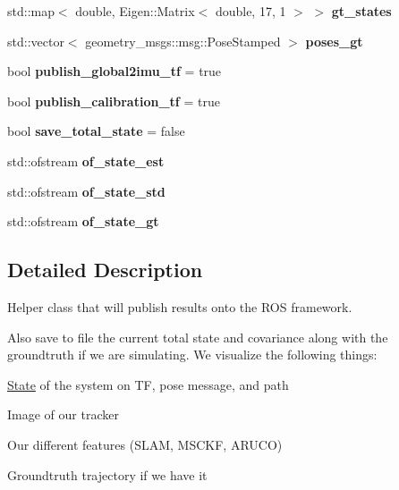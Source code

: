 \begin{DoxyCompactItemize}
std\+::map$<$ double, Eigen\+::\+Matrix$<$ double, 17, 1 $>$ $>$ {\bfseries gt\+\_\+states}
\item 
\mbox{\label{classov__msckf_1_1ROS2Visualizer_ae207f16406cb99dfd752291750f859fc}} 
std\+::vector$<$ geometry\+\_\+msgs\+::msg\+::\+Pose\+Stamped $>$ {\bfseries poses\+\_\+gt}
\item 
\mbox{\label{classov__msckf_1_1ROS2Visualizer_a9d79dfc6a3476a1147dfd25f817ff9d5}} 
bool {\bfseries publish\+\_\+global2imu\+\_\+tf} = true
\item 
\mbox{\label{classov__msckf_1_1ROS2Visualizer_a7eac7eb727e5670bf9981eee45325631}} 
bool {\bfseries publish\+\_\+calibration\+\_\+tf} = true
\item 
\mbox{\label{classov__msckf_1_1ROS2Visualizer_a8f52abe9f907981edbe866664549bbf6}} 
bool {\bfseries save\+\_\+total\+\_\+state} = false
\item 
\mbox{\label{classov__msckf_1_1ROS2Visualizer_a5ef7d80542a74e6ef2f146cc5bad4320}} 
std\+::ofstream {\bfseries of\+\_\+state\+\_\+est}
\item 
\mbox{\label{classov__msckf_1_1ROS2Visualizer_a7a69323dfd959c997384d1eb2bb26817}} 
std\+::ofstream {\bfseries of\+\_\+state\+\_\+std}
\item 
\mbox{\label{classov__msckf_1_1ROS2Visualizer_a1b7bcd2fc53fd93efd293870351f6991}} 
std\+::ofstream {\bfseries of\+\_\+state\+\_\+gt}
\end{DoxyCompactItemize}


\subsection{Detailed Description}
Helper class that will publish results onto the R\+OS framework. 

Also save to file the current total state and covariance along with the groundtruth if we are simulating. We visualize the following things\+:
\begin{DoxyItemize}
\item \hyperlink{classov__msckf_1_1State}{State} of the system on TF, pose message, and path
\item Image of our tracker
\item Our different features (S\+L\+AM, M\+S\+C\+KF, A\+R\+U\+CO)
\item Groundtruth trajectory if we have it 
\end{DoxyItemize}


